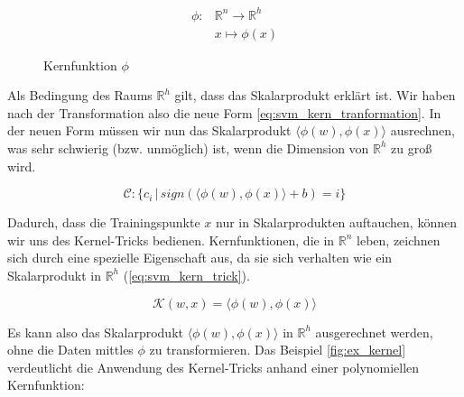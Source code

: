 \begin{equation}
\label{eq:svm_kernel_function}
\begin{split}
    \phi : & \mathbb{R}^n \to \mathbb{R}^h \\
    & x \mapsto \phi(x)
\end{split} 
\end{equation}

\begin{figure}[htbp] \centering
    \caption{Kernfunktion $\phi$}
    \label{fig:svm_kernel}
\end{figure}

Als Bedingung des Raums $\mathbb{R}^h$ gilt, dass das Skalarprodukt erklärt ist. 
Wir haben nach der Transformation also die neue Form \ref{eq:svm_kern_tranformation}. 
In der neuen Form müssen wir nun das Skalarprodukt $\langle\phi(w),\phi(x)\rangle$ ausrechnen, was sehr schwierig (bzw. unmöglich) ist, wenn die Dimension von $\mathbb{R}^h$ zu groß wird.

\begin{equation}
\label{eq:svm_kern_tranformation}
    \mathcal{C}: \{ c_i \,|\, sign(\langle \phi(w),\phi(x) \rangle + b) = i \}
\end{equation}


Dadurch, dass die Trainingspunkte $x$ nur in Skalarprodukten auftauchen, können wir uns des Kernel-Tricks bedienen.
Kernfunktionen, die in $\mathbb{R}^n$ leben, zeichnen sich durch eine spezielle Eigenschaft aus, da sie sich verhalten wie ein Skalarprodukt in $\mathbb{R}^h$ (\ref{eq:svm_kern_trick}). 

\begin{equation}
\label{eq:svm_kern_trick}
    \mathcal{K}(w,x) = \langle\phi(w),\phi(x)\rangle
\end{equation}

Es kann also das Skalarprodukt $\langle\phi(w),\phi(x)\rangle$ in $\mathbb{R}^h$ ausgerechnet werden, ohne die Daten mittles $\phi$ zu transformieren. 
Das Beispiel \ref{fig:ex_kernel} verdeutlicht die Anwendung des Kernel-Tricks  anhand einer polynomiellen Kernfunktion:

